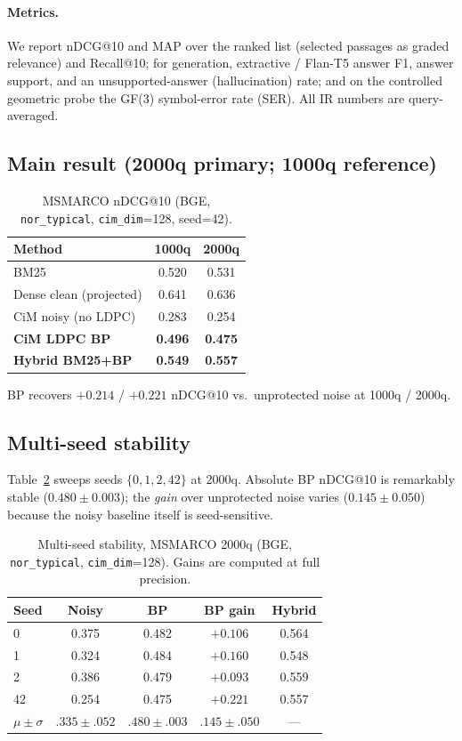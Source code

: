 \documentclass[sigconf,review,anonymous]{acmart}
\begin{document}
\paragraph{Metrics.} We report nDCG@10 and MAP over the ranked list (selected passages as graded relevance) and Recall@10; for generation, extractive / Flan-T5 answer F1, answer support, and an unsupported-answer (hallucination) rate; and on the controlled geometric probe the GF(3) symbol-error rate (SER). All IR numbers are query-averaged.

\subsection{Main result (2000q primary; 1000q reference)}
\begin{table}[t]
\caption{MSMARCO nDCG@10 (BGE, \texttt{nor\_typical}, \texttt{cim\_dim}=128, seed=42).}
\label{tab:main}
\begin{tabular}{lcc}
\toprule
Method & 1000q & 2000q \\
\midrule
BM25 & 0.520 & 0.531 \\
Dense clean (projected) & 0.641 & 0.636 \\
CiM noisy (no LDPC) & 0.283 & 0.254 \\
\textbf{CiM LDPC BP} & \textbf{0.496} & \textbf{0.475} \\
\textbf{Hybrid BM25+BP} & \textbf{0.549} & \textbf{0.557} \\
\bottomrule
\end{tabular}
\end{table}

BP recovers $+0.214$ / $+0.221$ nDCG@10 vs.\ unprotected noise at 1000q / 2000q.
\subsection{Multi-seed stability}
Table~\ref{tab:multiseed} sweeps seeds $\{0,1,2,42\}$ at 2000q.
Absolute BP nDCG@10 is remarkably stable ($0.480\pm0.003$); the \emph{gain} over unprotected noise varies ($0.145\pm0.050$) because the noisy baseline itself is seed-sensitive.
\begin{table}[t]
\caption{Multi-seed stability, MSMARCO 2000q (BGE, \texttt{nor\_typical}, \texttt{cim\_dim}=128). Gains are computed at full precision.}
\label{tab:multiseed}
\small
\setlength{\tabcolsep}{4pt}
\begin{tabular}{lcccc}
\toprule
Seed & Noisy & BP & BP gain & Hybrid \\
\midrule
0 & 0.375 & 0.482 & $+0.106$ & 0.564 \\
1 & 0.324 & 0.484 & $+0.160$ & 0.548 \\
2 & 0.386 & 0.479 & $+0.093$ & 0.559 \\
42 & 0.254 & 0.475 & $+0.221$ & 0.557 \\
\midrule
$\mu{\pm}\sigma$ & $.335{\pm}.052$ & $.480{\pm}.003$ & $.145{\pm}.050$ & --- \\
\bottomrule
\end{tabular}
\end{table}
\end{document}
